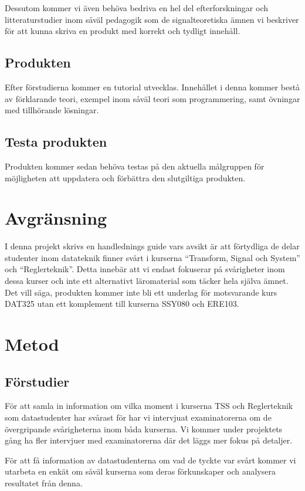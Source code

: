 \documentclass{article}
\begin{document}
Dessutom kommer vi även behöva bedriva en hel del efterforskningar
och litteraturstudier inom såväl pedagogik som de signalteoretiska
ämnen vi beskriver för att kunna skriva en produkt med korrekt och
tydligt innehåll.

\subsection{Produkten}
Efter förstudierna kommer en tutorial utvecklas.
%
Innehållet i denna kommer bestå av förklarande teori,
exempel inom såväl teori som programmering, samt övningar
med tillhörande lösningar.

\subsection{Testa produkten}
Produkten kommer sedan behöva testas på den aktuella målgruppen för
möjligheten att uppdatera och förbättra den slutgiltiga produkten.

\section{Avgränsning}
I denna projekt skrivs en handlednings guide vars avsikt är att
förtydliga de delar studenter inom datateknik finner svårt i kurserna
“Transform, Signal och System” och “Reglerteknik”.
%
Detta innebär att vi endast fokuserar på svårigheter inom dessa kurser
och inte ett alternativt läromaterial som täcker hela själva ämnet.
%
Det vill säga, produkten kommer inte bli ett underlag för motsvarande
kurs DAT325 utan ett komplement till kurserna SSY080 och ERE103.

\section{Metod}
\subsection{Förstudier}
För att samla in information om vilka moment i kurserna
TSS och Reglerteknik som datastudenter har svårast för har
vi intervjuat examinatorerna om de övergripande
svårigheterna inom båda kurserna.
Vi kommer under projektets gång ha fler intervjuer med
examinatorerna där det läggs mer fokus på detaljer.

För att få information av datastudenterna om vad de tyckte
var svårt kommer vi utarbeta en enkät om såväl kurserna
som deras förkunskaper och analysera resultatet från denna.
\end{document}
